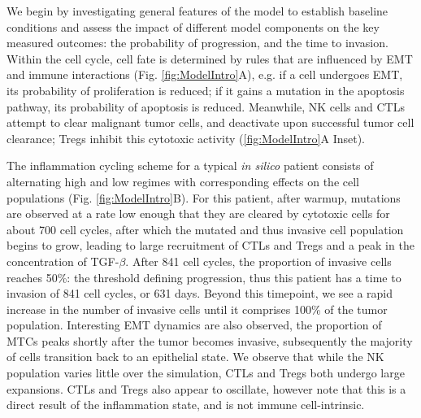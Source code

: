 \documentclass[11pt]{article}
\begin{document}
We begin by investigating general features of the model to establish baseline conditions and assess the impact of different model components on the key measured outcomes: the probability of progression, and the time to invasion. 
Within the cell cycle, cell fate is determined by rules that are influenced by EMT and immune interactions (Fig. \ref{fig:ModelIntro}A), e.g. if a cell undergoes EMT, its probability of proliferation is reduced; if it gains a  mutation in the apoptosis pathway, its probability of apoptosis is reduced. Meanwhile, NK cells and CTLs attempt to clear malignant tumor cells, and deactivate upon successful tumor cell clearance; Tregs inhibit this cytotoxic activity (\ref{fig:ModelIntro}A Inset).
\par
The inflammation cycling scheme for a typical {\it in silico} patient consists of alternating high and low regimes with corresponding effects on the cell populations (Fig. \ref{fig:ModelIntro}B).
For this patient, after warmup, mutations are observed at a rate low enough that they are cleared by cytotoxic cells for about 700 cell cycles, after which the mutated and thus invasive cell population begins to grow, leading to large recruitment of CTLs and Tregs and a peak in the concentration of TGF-$\beta$.
After 841 cell cycles, the proportion of invasive cells reaches 50\%: the threshold defining progression, thus this patient has a time to invasion of 841 cell cycles, or 631 days. Beyond this timepoint, we see a rapid increase in the number of invasive cells until it comprises 100\% of the tumor population. Interesting EMT dynamics are also observed, the proportion of MTCs peaks shortly after the tumor becomes invasive, subsequently the majority of cells transition back to an epithelial state. We observe that while the NK population varies little over the simulation, CTLs and Tregs both undergo large expansions. CTLs and Tregs also appear to oscillate, however note that this is a direct result of the inflammation state, and is not immune cell-intrinsic.
\end{document}
